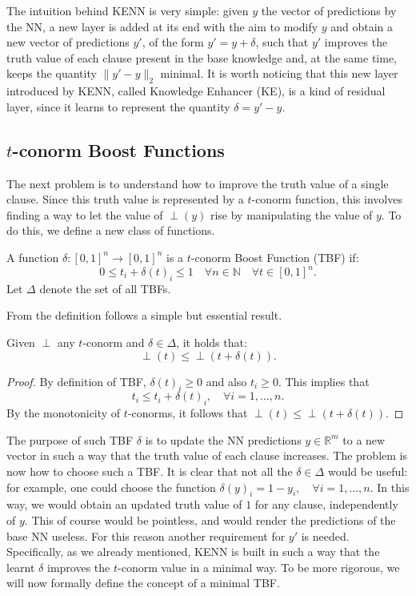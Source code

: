 The intuition behind KENN is very simple: given $y$ the vector of predictions by the NN, a new layer is added at its end with the aim to modify $y$ and obtain a new vector of predictions $y'$, of the form $y'=y+\delta$, such that $y'$ improves the truth value of each clause present in the base knowledge and, at the same time, keeps the quantity $\|y'-y\|_2$ minimal. It is worth noticing that this new layer introduced by KENN, called Knowledge Enhancer (KE), is a kind of residual layer, since it learns to represent the quantity $\delta = y'-y$.

\subsection{$t$-conorm Boost Functions}
The next problem is to understand how to improve the truth value of a single clause. Since this truth value is represented by a $t$-conorm function, this involves finding a way to let the value of $\perp(y)$ rise by manipulating the value of $y$. To do this, we define a new class of functions.

\begin{definition}
	A function $\delta:[0,1]^{n} \rightarrow[0,1]^{n}$ is a $t$-conorm Boost Function (TBF) if:
	$$
	0 \leq t_{i}+\delta(t)_{i} \leq 1  \quad \forall n \in \mathbb{N} \quad \forall t \in[0,1]^{n}.
	$$
	Let $\Delta$ denote the set of all TBFs.
\end{definition}
From the definition follows a simple but essential result.

\begin{lemma}
	Given $\perp$ any $t$-conorm and $\delta \in \Delta$, it holds that:
	$$ \perp(t) \leq \perp(t + \delta(t)).$$
\end{lemma}
\begin{proof}
	By definition of TBF, $\delta(t)_i \geq 0$ and also $t_i \geq 0$. This implies that $$t_i \leq t_i + \delta(t)_i, \quad \forall i=1,\dots,n.$$By the monotonicity of $t$-conorms, it follows that $\perp(t) \leq \perp(t+\delta(t))$.
\end{proof}

The purpose of such TBF $\delta$ is to update the NN predictions $y \in \mathbb{R}^m$ to a new vector %
in such a way that the truth value of each clause increases. The problem is now how to choose such a TBF. It is clear that not all the $\delta \in \Delta$ would be useful: for example, one could choose the function $\delta(y)_i = 1-y_i, \quad \forall i=1,\dots,n$. In this way, we would obtain an updated truth value of $1$ for any clause, independently of $y$. This of course would be pointless, and would render the predictions of the base NN useless. For this reason another requirement for $y'$ is needed. Specifically, as we already mentioned, KENN is built in such a way that the learnt $\delta$ improves the $t$-conorm value in a minimal way. To be more rigorous, we will now formally define the concept of a minimal TBF.

